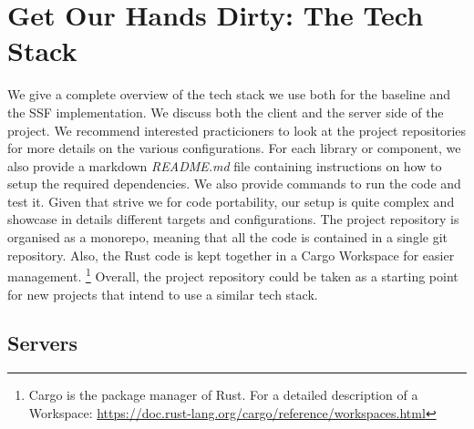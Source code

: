 \section{Get Our Hands Dirty: The Tech Stack}

We give a complete overview of the tech stack we use both
for the baseline and the SSF implementation.
We discuss both the client and the server side of the project.
We recommend interested practicioners to look at the
project repositories for more details on the various
configurations.
For each library or component, we also provide a markdown
\textit{README.md} file containing instructions on how to
setup the required dependencies. We also provide commands
to run the code and test it.
Given that strive we for code portability, our setup
is quite complex and showcase in details
different targets and configurations.
The project repository is organised as a monorepo,
meaning that all the code is contained in a single
git repository. Also, the Rust code is kept
together in a Cargo Workspace for easier management.%
\footnote{Cargo is the package manager of Rust.
For a detailed description of a Workspace: \url{https://doc.rust-lang.org/cargo/reference/workspaces.html}}
Overall, the project repository
could be taken as a starting point for new projects that
intend to use a similar tech stack.

\subsection{Servers}\label{ssc:servers}

